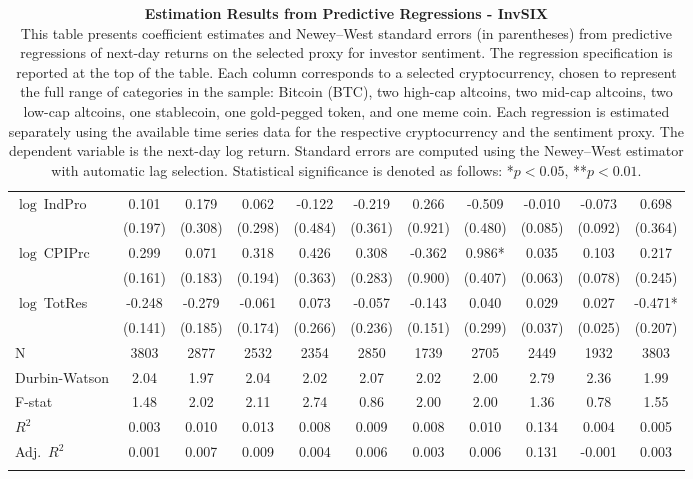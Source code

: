 \begin{table}[ht]
\begin{tabular}{l *{10}{c}}
\addlinespace
$\log\ $IndPro & 0.101 & 0.179 & 0.062 & -0.122 & -0.219 & 0.266 & -0.509 & -0.010 & -0.073 & 0.698 \\
 & (0.197) & (0.308) & (0.298) & (0.484) & (0.361) & (0.921) & (0.480) & (0.085) & (0.092) & (0.364) \\
\addlinespace
$\log\ $CPIPrc & 0.299 & 0.071 & 0.318 & 0.426 & 0.308 & -0.362 & 0.986* & 0.035 & 0.103 & 0.217 \\
 & (0.161) & (0.183) & (0.194) & (0.363) & (0.283) & (0.900) & (0.407) & (0.063) & (0.078) & (0.245) \\
\addlinespace
$\log\ $TotRes & -0.248 & -0.279 & -0.061 & 0.073 & -0.057 & -0.143 & 0.040 & 0.029 & 0.027 & -0.471* \\
 & (0.141) & (0.185) & (0.174) & (0.266) & (0.236) & (0.151) & (0.299) & (0.037) & (0.025) & (0.207) \\
\addlinespace
\midrule
N & 3803 & 2877 & 2532 & 2354 & 2850 & 1739 & 2705 & 2449 & 1932 & 3803 \\
Durbin-Watson & 2.04 & 1.97 & 2.04 & 2.02 & 2.07 & 2.02 & 2.00 & 2.79 & 2.36 & 1.99 \\
F-stat & 1.48 & 2.02 & 2.11 & 2.74 & 0.86 & 2.00 & 2.00 & 1.36 & 0.78 & 1.55 \\
\(R^2\) & 0.003 & 0.010 & 0.013 & 0.008 & 0.009 & 0.008 & 0.010 & 0.134 & 0.004 & 0.005 \\
Adj.\ \(R^2\) & 0.001 & 0.007 & 0.009 & 0.004 & 0.006 & 0.003 & 0.006 & 0.131 & -0.001 & 0.003 \\
\addlinespace
\midrule
\multicolumn{11}{c}{Specification tested: $R_{i,t+1} = \alpha_i + \beta_{sent} S_t + \phi R_{i,t} + \theta B_{i,t} + \gamma M_t + \varepsilon_{i,t+1}$}\\
\bottomrule
\end{tabular}
\caption{\textbf{Estimation Results from Predictive Regressions - InvSIX} \\
This table presents coefficient estimates and Newey--West standard errors (in parentheses) from predictive regressions of next-day returns on the selected proxy for investor sentiment. The regression specification is reported at the top of the table. Each column corresponds to a selected cryptocurrency, chosen to represent the full range of categories in the sample: Bitcoin (BTC), two high-cap altcoins, two mid-cap altcoins, two low-cap altcoins, one stablecoin, one gold-pegged token, and one meme coin. Each regression is estimated separately using the available time series data for the respective cryptocurrency and the sentiment proxy. The dependent variable is the next-day log return. Standard errors are computed using the Newey--West estimator with automatic lag selection. Statistical significance is denoted as follows: *$p<0.05$, **$p<0.01$.}
\label{tab:invsix_result_h1}
\end{table}